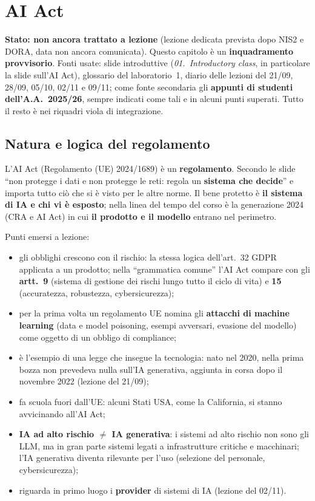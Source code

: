 \chapter{AI Act}
\label{cap:aiact}

\begin{nota}
\textbf{Stato: non ancora trattato a lezione} (lezione dedicata prevista dopo NIS2 e DORA, data non
ancora comunicata). Questo capitolo è un \textbf{inquadramento provvisorio}. Fonti usate: slide
introduttive (\emph{01.~Introductory class}, in particolare la slide sull'AI Act), glossario del
laboratorio~1, diario delle lezioni del 21/09, 28/09, 05/10, 02/11 e 09/11; come fonte secondaria gli
\textbf{appunti di studenti dell'A.A.~2025/26}, sempre indicati come tali e in alcuni punti superati.
Tutto il resto è nei riquadri viola di integrazione.
\end{nota}

\section{Natura e logica del regolamento}
\label{sec:aiact-natura}

L'AI Act (Regolamento (UE) 2024/1689) è un \textbf{regolamento}. Secondo le slide ``non protegge i dati
e non protegge le reti: regola un \textbf{sistema che decide}'' e importa tutto ciò che si è visto per
le altre norme. Il bene protetto è \textbf{il sistema di IA e chi vi è esposto}; nella linea del tempo
del corso è la generazione 2024 (CRA e AI Act) in cui \textbf{il prodotto e il modello} entrano nel
perimetro.

Punti emersi a lezione:
\begin{itemize}
  \item gli obblighi crescono con il rischio: la stessa logica dell'art.~32 GDPR applicata a un
    prodotto; nella ``grammatica comune'' l'AI Act compare con gli \textbf{artt.~9} (sistema di
    gestione dei rischi lungo tutto il ciclo di vita) e \textbf{15} (accuratezza, robustezza,
    cybersicurezza);
  \item per la prima volta un regolamento UE nomina gli \textbf{attacchi di machine learning} (data e
    model poisoning, esempi avversari, evasione del modello) come oggetto di un obbligo di compliance;
  \item è l'esempio di una legge che insegue la tecnologia: nato nel 2020, nella prima bozza non
    prevedeva nulla sull'IA generativa, aggiunta in corsa dopo il novembre 2022 (lezione del 21/09);
  \item fa scuola fuori dall'UE: alcuni Stati USA, come la California, si stanno avvicinando
    all'AI Act;
  \item \textbf{IA ad alto rischio $\neq$ IA generativa}: i sistemi ad alto rischio non sono gli LLM,
    ma in gran parte sistemi legati a infrastrutture critiche e macchinari; l'IA generativa diventa
    rilevante per l'uso (selezione del personale, cybersicurezza);
  \item riguarda in primo luogo i \textbf{provider} di sistemi di IA (lezione del 02/11).
\end{itemize}

